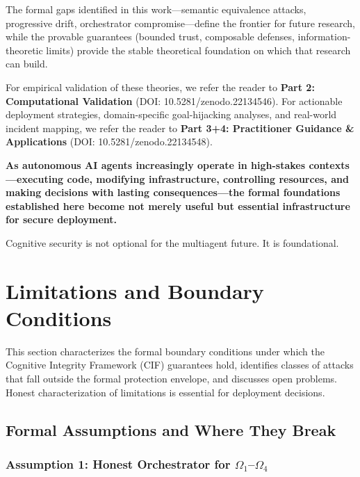 \documentclass[
]{article}
\begin{document}
The formal gaps identified in this work---semantic equivalence attacks,
progressive drift, orchestrator compromise---define the frontier for
future research, while the provable guarantees (bounded trust,
composable defenses, information-theoretic limits) provide the stable
theoretical foundation on which that research can build.

For empirical validation of these theories, we refer the reader to
\textbf{Part 2: Computational Validation} (DOI:
10.5281/zenodo.22134546). For actionable deployment strategies,
domain-specific goal-hijacking analyses, and real-world incident
mapping, we refer the reader to \textbf{Part 3+4: Practitioner Guidance
\& Applications} (DOI: 10.5281/zenodo.22134548).

\textbf{As autonomous AI agents increasingly operate in high-stakes contexts---executing code, modifying infrastructure, controlling resources, and making decisions with lasting consequences---the formal foundations established here become not merely useful but essential infrastructure for secure deployment.}

Cognitive security is not optional for the multiagent future. It is
foundational.

\newpage

\newpage

\section{Limitations and Boundary Conditions}\label{sec:limitations}

This section characterizes the formal boundary conditions under which
the Cognitive Integrity Framework (CIF) guarantees hold, identifies
classes of attacks that fall outside the formal protection envelope, and
discusses open problems. Honest characterization of limitations is
essential for deployment decisions.

\subsection{Formal Assumptions and Where They
Break}\label{sec:assumption-breakdown}

\subsubsection{\texorpdfstring{Assumption 1: Honest Orchestrator for
\(\Omega_1\)--\(\Omega_4\)}{Assumption 1: Honest Orchestrator for Omega_1--Omega_4}}\label{assumption-1-honest-orchestrator-for-omega_1omega_4}
\end{document}
